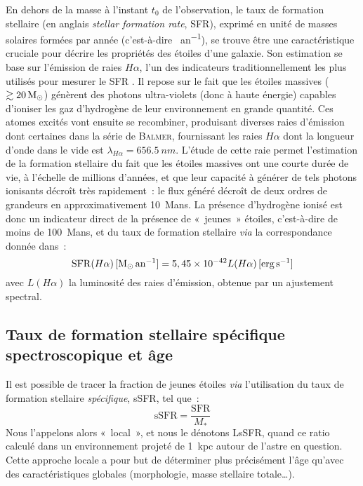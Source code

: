 \documentclass[../main/main.tex]{subfiles}
\begin{document}
En dehors de la masse à l'instant $t_0$ de l'observation, le taux de formation
stellaire (en anglais \textit{stellar formation rate}, SFR), exprimé en unité de
masses solaires formées par année (c'est-à-dire \si{\Msun.an^{-1}}), se trouve
être une caractéristique cruciale pour décrire les propriétés des étoiles d'une
galaxie. Son estimation se base sur l'émission de raies $H\alpha$, l'un des
indicateurs traditionnellement les plus utilisés pour mesurer le SFR
\citep{kennicutt1998}. Il repose sur le fait que les étoiles massives ($\gtrsim
\SI{20}{\Msun}$) génèrent des photons ultra-violets (donc à haute énergie)
capables d'ioniser les gaz d'hydrogène de leur environnement
\citep{calzetti2013} en grande quantité. Ces atomes excités vont ensuite se
recombiner, produisant diverses raies d'émission dont certaines dans la série de
\textsc{Balmer}, fournissant les raies $H\alpha$ dont la longueur d'onde dans le
vide est $\lambda_{H\alpha} = \SI{656.5}{nm}$. L'étude de cette raie permet
l'estimation de la formation stellaire du fait que les étoiles massives ont une
courte durée de vie, à l'échelle de millions d'années, et que leur capacité à
générer de tels photons ionisants décroît très rapidement~: le flux généré
décroît de deux ordres de grandeurs en approximativement \SI{10}{Mans}. La
présence d'hydrogène ionisé est donc un indicateur direct de la présence de
«~jeunes~» étoiles, c'est-à-dire de moins de \SI{100}{Mans}, et du taux de
formation stellaire \textit{via} la correspondance donnée
dans~\cite{calzetti2013}:
\begin{equation}\label{eq:sfrha}
    \mathrm{SFR}(H\alpha)\,[\si{\Msun.an^{-1}}] =
    5,45\times 10^{-42}L(H\a)\,[\si{erg.s^{-1}}]
\end{equation}
avec $L(H\alpha)$ la luminosité des raies d'émission, obtenue par un ajustement
spectral.

\subsection{Taux de formation stellaire spécifique
spectroscopique et âge}\label{ssec:lssfr}

Il est possible de tracer la fraction de jeunes étoiles \textit{via}
l'utilisation du taux de formation stellaire \textit{spécifique}, sSFR, tel
que~:
\begin{equation}\label{eq:ssfr}
    \mathrm{sSFR} = \frac{\mathrm{SFR}}{M_*}
\end{equation}
Nous l'appelons alors «~local~», et nous le dénotons LsSFR, quand ce ratio
calculé dans un environnement projeté de \SI{1}{kpc} autour de l'astre en
question. Cette approche locale a pour but de déterminer plus précisément l'âge
qu'avec des caractéristiques globales (morphologie, masse stellaire totale…).
\end{document}
